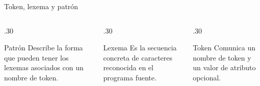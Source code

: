 \documentclass[11pt,spanish]{beamer}
\begin{document}
\begin{frame}{Token, lexema y patrón}
\vfill

\begin{columns}[T,onlytextwidth]
\begin{column}{.30\textwidth}
\begin{block}{Patrón}
\small
Describe la forma que pueden tener los lexemas asociados con un nombre de token.
\end{block}
\end{column}
\hfill
\begin{column}{.30\textwidth}
\begin{block}{Lexema}
\small
Es la secuencia concreta de caracteres reconocida en el programa fuente.
\end{block}
\end{column}
\hfill
\begin{column}{.30\textwidth}
\begin{block}{Token}
\small
Comunica un nombre de token y un valor de atributo opcional.
\end{block}
\end{column}
\end{columns}

\bigskip

\begin{center}
\end{center}

\vfill
\end{frame}
\end{document}
